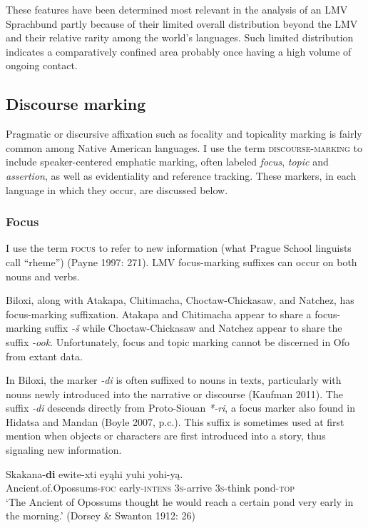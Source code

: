 \documentclass[output=paper]{LSP/langsci}
\begin{document}
These features have been determined most relevant in the analysis of an LMV Sprachbund partly because of their limited overall distribution beyond the LMV and their relative rarity among the world’s languages. Such limited distribution indicates a comparatively confined area probably once having a high volume of ongoing contact.

\subsection{Discourse marking}

Pragmatic or discursive affixation such as focality and topicality marking is fairly common among Native American languages. I use the term \textsc{discourse-marking} to include speaker-centered emphatic marking, often labeled \emph{focus}, \emph{topic} and \emph{assertion}, as well as evidentiality and reference tracking. These markers, in each language in which they occur, are discussed below.

\subsubsection{Focus}
	
I use the term \textsc{focus} to refer to new information (what Prague School linguists call “rheme”) (Payne 1997: 271). LMV focus-marking suffixes can occur on both nouns and verbs.

	Biloxi, along with Atakapa, Chitimacha, Choctaw-Chickasaw, and Natchez, has focus-marking suffixation. Atakapa and Chitimacha appear to share a focus-marking suffix \emph{-š} while Choctaw-Chickasaw and Natchez appear to share the suffix \emph{-ook}. Unfortunately, focus and topic marking cannot be discerned in Ofo from extant data.

In Biloxi, the marker \emph{-di} is often suffixed to nouns in texts, particularly with nouns newly introduced into the narrative or discourse (Kaufman 2011). The suffix \emph{-di} descends directly from Proto-Siouan \emph{*-ri}, a focus marker also found in Hidatsa and Mandan (Boyle 2007, p.c.). This suffix is sometimes used at first mention when objects or characters are first introduced into a story, thus signaling new information. 

\ea\label{possumpond}
\gll 	Skakana-\textbf{di} ewite-xti eyąhi yuhi yohi-y\k{a}. \\
	Ancient.of.Opossums-\textsc{foc} early-\textsc{intens} \textsc{3s}-arrive \textsc{3s}-think pond-\textsc{top}\\
\glt `The Ancient of Opossums thought he would reach a certain pond very early in the morning.' (Dorsey \& Swanton 1912: 26)
\z
\end{document}
